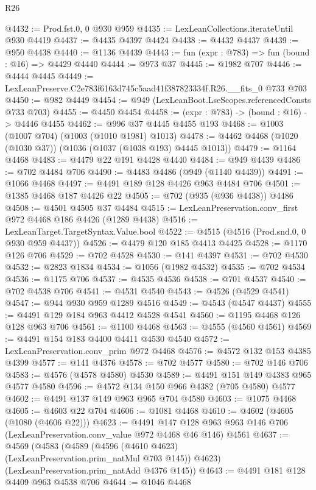 \begin{lexlean}{R26}
\begin{coremodule}
@4432 := Prod.fst.{0, 0} @930 @959
@4435 := LexLeanCollections.iterateUntil @930 @4419
@4437 := @4435 @4397 @4424
@4438 := @4432 @4437
@4439 := @950 @4438
@4440 := @1136 @4439
@4443 := fun (expr : @783) => fun (bound : @16) => @4429 @4440
@4444 := @973 @37
@4445 := @1982 @707
@4446 := @4444 @4445
@4449 := LexLeanPreserve.C2e783f6163d745c5aad41f387823334f.R26.__fits_0 @733 @703
@4450 := @982 @4449
@4454 := @949 (LexLeanBoot.LseScopes.referencedConsts @733 @703)
@4455 := @4450 @4454
@4458 := (expr : @783) -> (bound : @16) -> @4446 @4455
@4462 := @996 @37 @4445 @4455 @193
@4468 := @1003 (@1007 @704) (@1003 (@1010 @1981) @1013)
@4478 := @4462 @4468 (@1020 (@1030 @37)) (@1036 (@1037 (@1038 @193) @4445 @1013))
@4479 := @1164 @4468
@4483 := @4479 @22 @191 @4428 @4440
@4484 := @949 @4439
@4486 := @702 @4484 @706
@4490 := @4483 @4486 (@949 (@1140 @4439))
@4491 := @1066 @4468
@4497 := @4491 @189 @128 @4426 @963 @4484 @706
@4501 := @1385 @4468 @187 @4426 @22
@4505 := @702 (@935 (@936 @4438)) @4486
@4508 := @4501 @4505 @37 @4484
@4515 := LexLeanPreservation.conv_first @972 @4468 @186 @4426 (@1289 @4438)
@4516 := LexLeanTarget.TargetSyntax.Value.bool
@4522 := @4515 (@4516 (Prod.snd.{0, 0} @930 @959 @4437))
@4526 := @4479 @120 @185 @4413 @4425
@4528 := @1170 @126 @706
@4529 := @702 @4528
@4530 := @141 @4397
@4531 := @702 @4530
@4532 := @2823 @1834
@4534 := @1056 (@1982 @4532)
@4535 := @702 @4534
@4536 := @1175 @706
@4537 := @4535 @4536
@4538 := @701 @4537
@4540 := @702 @4538 @706
@4541 := @4531 @4540
@4543 := @4526 (@4529 @4541)
@4547 := @944 @930 @959 @1289 @4516
@4549 := @4543 (@4547 @4437)
@4555 := @4491 @129 @184 @963 @4412 @4528 @4541
@4560 := @1195 @4468 @126 @128 @963 @706
@4561 := @1100 @4468
@4563 := @4555 (@4560 @4561)
@4569 := @4491 @154 @183 @4400 @4411 @4530 @4540
@4572 := LexLeanPreservation.conv_prim @972 @4468
@4576 := @4572 @132 @153 @4385 @4399
@4577 := @141 @4376
@4578 := @702 @4577
@4580 := @702 @146 @706
@4583 := @4576 (@4578 @4580) @4530
@4589 := @4491 @151 @149 @4383 @965 @4577 @4580
@4596 := @4572 @134 @150 @966 @4382 (@705 @4580) @4577
@4602 := @4491 @137 @149 @963 @965 @704 @4580
@4603 := @1075 @4468
@4605 := @4603 @22 @704
@4606 := @1081 @4468
@4610 := @4602 (@4605 (@1080 (@4606 @22)))
@4623 := @4491
    @147
    @128
    @963
    @963
    @146
    @706
    (LexLeanPreservation.conv_value @972 @4468 @46 @146)
    @4561
@4637 := @4569
    (@4583
      (@4589 (@4596 (@4610 @4623) (LexLeanPreservation.prim_natMul @703 @145)) @4623)
      (LexLeanPreservation.prim_natAdd @4376 @145))
@4643 := @4491 @181 @128 @4409 @963 @4538 @706
@4644 := @1046 @4468

\end{coremodule}
\end{lexlean}
